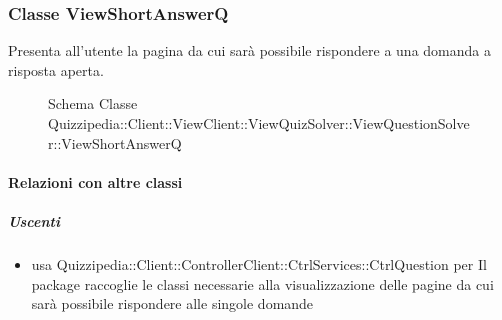 \subsubsection{Classe ViewShortAnswerQ}
Presenta all'utente la pagina da cui sarà possibile rispondere a una domanda a risposta aperta.
\begin{figure}[H]
\centering
\noindent{}
\caption[Schema Classe ViewShortAnswerQ]{Schema Classe Quizzipedia::Client::ViewClient::ViewQuizSolver::ViewQuestionSolver::ViewShortAnswerQ}
\end{figure}
\paragraph{Relazioni con altre classi}
\subparagraph{Uscenti}
\begin{itemize}
\item usa Quizzipedia::Client::ControllerClient::CtrlServices::CtrlQuestion per Il package raccoglie le classi necessarie alla visualizzazione delle pagine da cui sarà possibile rispondere alle singole domande
\end{itemize}
